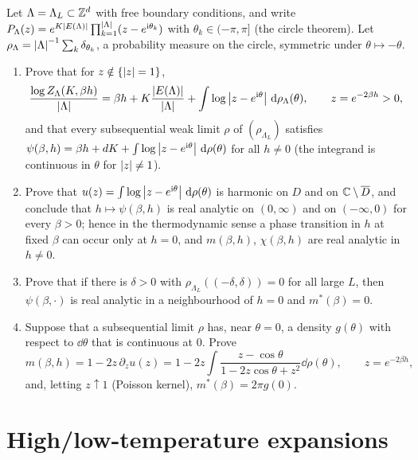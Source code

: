 \begin{exercise}
Let $\Lambda=\Lambda_L\subset\mathbb Z^d$ with free boundary conditions, and write
$P_\Lambda(z)=e^{K\left\lvert E(\Lambda)\right\rvert}\prod_{k=1}^{\left\lvert \Lambda\right\rvert}(z-e^{\mathrm i\theta_k})$
with $\theta_k\in(-\pi,\pi]$ (the circle theorem).  Let
$\rho_\Lambda=\left\lvert \Lambda\right\rvert^{-1}\sum_k\delta_{\theta_k}$, a probability measure on
the circle, symmetric under $\theta\mapsto-\theta$.
\begin{enumerate}[label=(\alph*)]
\item Prove that for $z\notin\{\left\lvert z\right\rvert=1\}$,
\[
 \frac{\log Z_\Lambda(K,\beta h)}{\left\lvert \Lambda\right\rvert}=\beta h+K\frac{\left\lvert E(\Lambda)\right\rvert}{\left\lvert \Lambda\right\rvert}
 +\int\log\left\lvert z-e^{\mathrm i\theta}\right\rvert\,\mathrm d\rho_\Lambda(\theta),\qquad z=e^{-2\beta h}>0 ,
\]
and that every subsequential weak limit $\rho$ of $(\rho_{\Lambda_L})$ satisfies
$\psi(\beta,h)=\beta h+dK+\int\log\left\lvert z-e^{\mathrm i\theta}\right\rvert\,\mathrm d\rho(\theta)$ for
all $h\ne0$ (the integrand is continuous in $\theta$ for $\left\lvert z\right\rvert\ne1$).
\item Prove that $u(z)=\int\log\left\lvert z-e^{\mathrm i\theta}\right\rvert\,\mathrm d\rho(\theta)$ is
harmonic on $D$ and on $\mathbb C\setminus\overline D$, and conclude that
$h\mapsto\psi(\beta,h)$ is real analytic on $(0,\infty)$ and on $(-\infty,0)$
for every $\beta>0$; hence in the thermodynamic sense a phase transition in
$h$ at fixed $\beta$ can occur only at $h=0$, and $m(\beta,h)$,
$\chi(\beta,h)$ are real analytic in $h\ne0$.
\item Prove that if there is $\delta>0$ with $\rho_{\Lambda_L}((-\delta,\delta))=0$
for all large $L$, then $\psi(\beta,\cdot)$ is real analytic in a
neighbourhood of $h=0$ and $m^*(\beta)=0$.
\item Suppose that a subsequential limit $\rho$ has, near $\theta=0$, a
density $g(\theta)$ with respect to $\dd\theta$ that is continuous at $0$.
Prove
\[
 m(\beta,h)=1-2z\,\partial_zu(z)=1-2z\int\frac{z-\cos\theta}{1-2z\cos\theta+z^2}\dd\rho(\theta),
 \qquad z=e^{-2\beta h},
\]
and, letting $z\uparrow1$ (Poisson kernel), $m^*(\beta)=2\pi g(0)$.
\end{enumerate}
\end{exercise}

\section{High/low-temperature expansions}

